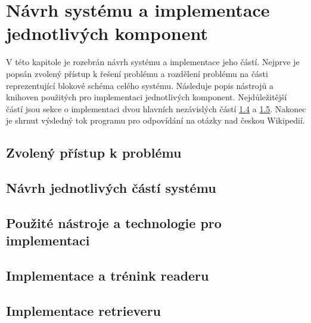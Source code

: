 
\chapter{Návrh systému a implementace jednotlivých komponent}
\label{design_and_implementation}
V této kapitole je rozebrán návrh systému a implementace jeho částí. Nejprve je popsán zvolený přístup k řešení problému a rozdělení problému na části reprezentující blokové schéma celého systému. Následuje popis nástrojů a knihoven použitých pro implementaci jednotlivých komponent. Nejdůležitější částí jsou sekce o implementaci dvou hlavních nezávislých částí \ref{reader} a \ref{retriever_imp}. Nakonec je shrnut výsledný tok programu pro odpovídání na otázky nad českou Wikipedií.


\section{Zvolený přístup k problému}


\section{Návrh jednotlivých částí systému}
\label{design}


\section{Použité nástroje a technologie pro implementaci}
\label{pouzite_nastroje}


\section{Implementace a trénink readeru}
\label{reader}


\section{Implementace retrieveru}
\label{retriever_imp}


